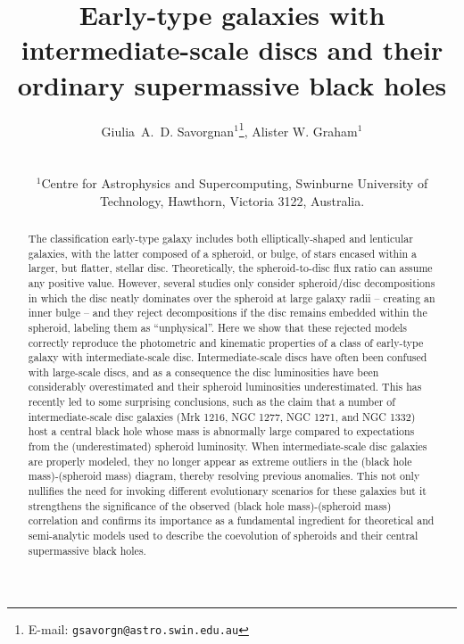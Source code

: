 \documentclass[useAMS,usenatbib,article]{mn2e}
\title[Intermediate-scale discs]{Early-type galaxies with intermediate-scale discs and their ordinary supermassive black holes}
\author[G.~A.~D. Savorgnan \& A.~W. Graham]
{\parbox{\textwidth}{
Giulia~A.~D. Savorgnan$^{1}$\thanks{E-mail: \texttt{gsavorgn@astro.swin.edu.au}},
Alister W. Graham$^{1}$}\vspace{0.4cm}\\
\parbox{\textwidth}{
$^{1}$Centre for Astrophysics and Supercomputing, Swinburne University of Technology, Hawthorn, Victoria 3122, Australia.\\}}
\begin{document}
\maketitle

\label{firstpage}



\begin{abstract}
The classification early-type galaxy includes both elliptically-shaped and lenticular galaxies, 
with the latter composed of a spheroid, or bulge, of stars encased within a larger, but flatter, stellar disc. 
Theoretically, the spheroid-to-disc flux ratio can assume any positive value. 
However, several studies only consider spheroid/disc decompositions 
in which the disc neatly dominates over the spheroid at large galaxy radii -- creating an inner bulge -- 
and they reject decompositions if the disc remains embedded within the spheroid, labeling them as ``unphysical''. 
Here we show that these rejected models correctly reproduce the photometric and kinematic properties of a class of early-type galaxy 
with intermediate-scale disc. 
Intermediate-scale discs have often been confused with large-scale discs, 
and as a consequence the disc luminosities have been considerably overestimated 
and their spheroid luminosities underestimated. 
This has recently led to some surprising conclusions, 
such as the claim that a number of intermediate-scale disc galaxies (Mrk 1216, NGC 1277, NGC 1271, and NGC 1332) 
host a central black hole whose mass is abnormally large compared to expectations from the (underestimated) spheroid luminosity. 
When intermediate-scale disc galaxies are properly modeled, 
they no longer appear as extreme outliers in the (black hole mass)-(spheroid mass) diagram, 
thereby resolving previous anomalies. 
This not only nullifies the need for invoking different evolutionary scenarios for these galaxies 
but it strengthens the significance of the observed (black hole mass)-(spheroid mass) correlation 
and confirms its importance as a fundamental ingredient for theoretical and semi-analytic models 
used to describe the coevolution of spheroids and their central supermassive black holes. 

\end{abstract}
\end{document}
